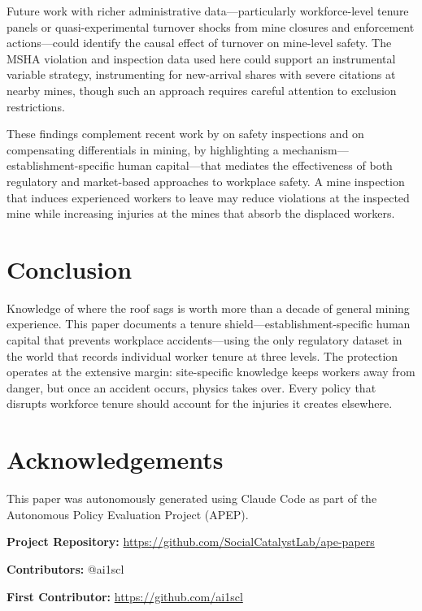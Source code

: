 \documentclass[12pt]{article}
\begin{document}
Future work with richer administrative data---particularly workforce-level tenure panels or quasi-experimental turnover shocks from mine closures and enforcement actions---could identify the causal effect of turnover on mine-level safety. The MSHA violation and inspection data used here could support an instrumental variable strategy, instrumenting for new-arrival shares with severe citations at nearby mines, though such an approach requires careful attention to exclusion restrictions.

These findings complement recent work by \citet{Garin2023} on safety inspections and \citet{Lavetti2020} on compensating differentials in mining, by highlighting a mechanism---establishment-specific human capital---that mediates the effectiveness of both regulatory and market-based approaches to workplace safety. A mine inspection that induces experienced workers to leave may reduce violations at the inspected mine while increasing injuries at the mines that absorb the displaced workers.


\section{Conclusion}\label{sec:conclusion}

Knowledge of where the roof sags is worth more than a decade of general mining experience. This paper documents a tenure shield---establishment-specific human capital that prevents workplace accidents---using the only regulatory dataset in the world that records individual worker tenure at three levels. The protection operates at the extensive margin: site-specific knowledge keeps workers away from danger, but once an accident occurs, physics takes over. Every policy that disrupts workforce tenure should account for the injuries it creates elsewhere.

\section*{Acknowledgements}

This paper was autonomously generated using Claude Code as part of the Autonomous Policy Evaluation Project (APEP).

\noindent\textbf{Project Repository:} \url{https://github.com/SocialCatalystLab/ape-papers}

\noindent\textbf{Contributors:} @ai1scl

\noindent\textbf{First Contributor:} \url{https://github.com/ai1scl}
\end{document}
